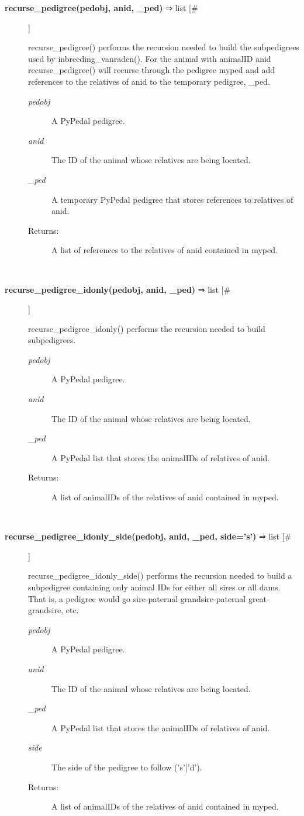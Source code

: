 \begin{description}
\item[\textbf{recurse\_pedigree(pedobj, anid, \_ped)} ⇒ list [\#]
]
\par recurse\_pedigree() performs the recursion needed to build the subpedigrees used by
inbreeding\_vanraden().  For the animal with animalID anid recurse\_pedigree() will
recurse through the pedigree myped and add references to the relatives of anid to
the temporary pedigree, \_ped.
\begin{description}
\item[\textit{pedobj}
]
A PyPedal pedigree.
\item[\textit{anid}
]
The ID of the animal whose relatives are being located.
\item[\textit{\_ped}
]
A temporary PyPedal pedigree that stores references to relatives of anid.
\item[Returns:
]
A list of references to the relatives of anid contained in myped.
\end{description}\\

\item[\textbf{recurse\_pedigree\_idonly(pedobj, anid, \_ped)} ⇒ list [\#]
]
\par recurse\_pedigree\_idonly() performs the recursion needed to build subpedigrees.
\begin{description}
\item[\textit{pedobj}
]
A PyPedal pedigree.
\item[\textit{anid}
]
The ID of the animal whose relatives are being located.
\item[\textit{\_ped}
]
A PyPedal list that stores the animalIDs of relatives of anid.
\item[Returns:
]
A list of animalIDs of the relatives of anid contained in myped.
\end{description}\\

\item[\textbf{recurse\_pedigree\_idonly\_side(pedobj, anid, \_ped, side='s')} ⇒ list [\#]
]
\par recurse\_pedigree\_idonly\_side() performs the recursion needed to build
a subpedigree containing only animal IDs for either all sires or all
dams.  That is, a pedigree would go sire-paternal grandsire-paternal
great-grandsire, etc.
\begin{description}
\item[\textit{pedobj}
]
A PyPedal pedigree.
\item[\textit{anid}
]
The ID of the animal whose relatives are being located.
\item[\textit{\_ped}
]
A PyPedal list that stores the animalIDs of relatives of anid.
\item[\textit{side}
]
The side of the pedigree to follow ('s'|'d').
\item[Returns:
]
A list of animalIDs of the relatives of anid contained in myped.
\end{description}\\


\end{description}
